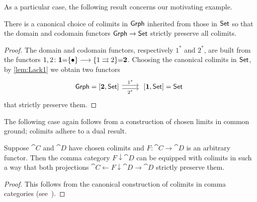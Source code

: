 \documentclass{amsart}
\begin{document}
As a particular case, the following result concerns our motivating example.
\begin{cor}
There is a canonical choice of colimits in $\mathsf{Grph}$ inherited from those in $\mathsf{Set}$ so that the domain and codomain functors $\mathsf{Grph}\to\mathsf{Set}$ strictly preserve all colimits.
\end{cor}

\begin{proof}
  The domain and codomain functors, respectively $1^\ast$ and
  $2^\ast$, are built from the functors
  $1,2\colon\mathbf{1}{=}\{\bullet\}\longrightarrow\{1\rightrightarrows2\}{=}\mathbf{2}$.  Choosing the canonical colimits in $\mathsf{Set}$, by \cref{lem:Lack1} we obtain two functors
\begin{displaymath}
\begin{tikzcd}
 \Grph=[\two,\Set]\ar[r,shift left,"1^\ast"]\ar[r,shift right,"2^\ast"'] & \;[\one,\Set]=\Set
 \end{tikzcd}
\end{displaymath}
that strictly preserve them.
\end{proof}

The following case again follows from a construction of chosen limits in common ground; colimits adhere to a dual result.
\begin{lem}
Suppose $\cat{C}$ and $\cat{D}$ have chosen colimits and $F\colon\cat{C}\to\cat{D}$ is an arbitrary functor. Then the comma category $F\downarrow\cat{D}$ can be equipped with colimits in such a way that both projections $\cat{C}\leftarrow F\downarrow\cat{D}\to\cat{D}$ strictly preserve them.
\end{lem}

\begin{proof}
 This follows from the canonical construction of colimits in comma categories (see~\cite[\S 2.16]{Handbook1}).
\end{proof}
\end{document}
